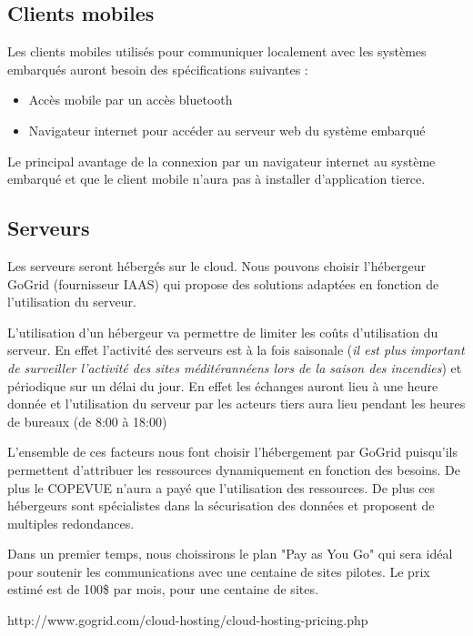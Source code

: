 \subsection{Clients mobiles}

Les clients mobiles utilisés pour communiquer localement avec les systèmes embarqués auront besoin des spécifications suivantes : 
\begin{itemize}
\item Accès mobile par un accès bluetooth
\item Navigateur internet pour accéder au serveur web du système embarqué
\end{itemize}
Le principal avantage de la connexion par un navigateur internet au système embarqué et que le client mobile n'aura pas à installer d'application tierce.

\subsection{Serveurs}

Les serveurs seront hébergés sur le cloud. Nous pouvons choisir l'hébergeur GoGrid (fournisseur IAAS) 
qui propose des solutions adaptées en fonction de l'utilisation du serveur.

L'utilisation d'un hébergeur va permettre de limiter les coûts d'utilisation du serveur. 
En effet l'activité des serveurs est à la fois saisonale 
(\textit{il est plus important de surveiller l'activité des sites méditérannéens lors de la saison des incendies}) et
périodique sur un délai du jour. En effet les échanges auront lieu à une heure donnée et l'utilisation du serveur par les acteurs tiers aura lieu pendant les heures de bureaux (de 8:00 à 18:00)

L'ensemble de ces facteurs nous font choisir l'hébergement par GoGrid puisqu'ils permettent d'attribuer les ressources dynamiquement en fonction des besoins. De plus le COPEVUE n'aura a payé que l'utilisation des ressources. De plus ces hébergeurs sont spécialistes dans la sécurisation des données et proposent de multiples redondances. 

Dans un premier temps, nous choissirons le plan "Pay as You Go" qui sera idéal pour soutenir les communications avec une centaine de sites pilotes. 
Le prix estimé est de 100\$ par mois, pour une centaine de sites.

http://www.gogrid.com/cloud-hosting/cloud-hosting-pricing.php

